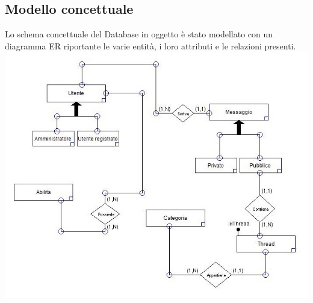 \documentclass[a4paper,12pt]{article}
\begin{document}
\subsection{Modello concettuale}
Lo schema concettuale del Database in oggetto è stato modellato con un diagramma ER riportante le varie entità, i loro attributi e le relazioni presenti.\\
\includegraphics[scale=0.751]{modelloER.png}
\end{document}
